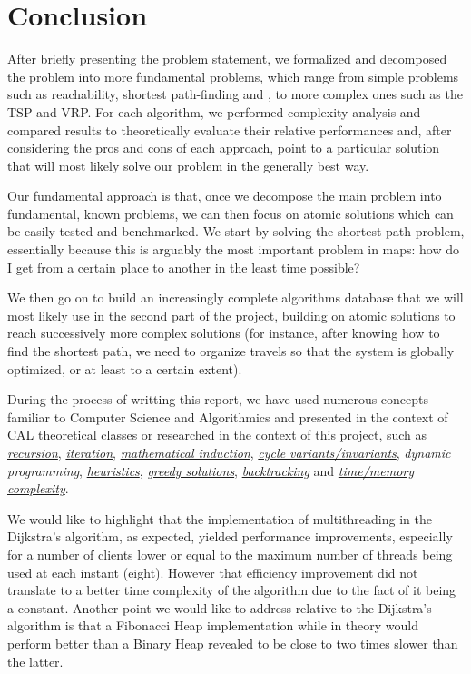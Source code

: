 \chapter{Conclusion} \label{conclusion}
After briefly presenting the problem statement, we formalized and decomposed the problem into more fundamental problems, which range from simple problems such as reachability, shortest path-finding and , to more complex ones such as the \acrshort{TSP} and \acrshort{VRP}. For each algorithm, we performed complexity analysis and compared results to theoretically evaluate their relative performances and, after considering the pros and cons of each approach, point to a particular solution that will most likely solve our problem in the generally best way.\par
Our fundamental approach is that, once we decompose the main problem into fundamental, known problems, we can then focus on atomic solutions which can be easily tested and benchmarked. We start by solving the shortest path problem, essentially because this is arguably the most important problem in maps: how do I get from a certain place to another in the least time possible?\par
We then go on to build an increasingly complete algorithms database that we will most likely use in the second part of the project, building on atomic solutions to reach successively more complex solutions (for instance, after knowing how to find the shortest path, we need to organize travels so that the system is globally optimized, or at least to a certain extent).\par
During the process of writting this report, we have used numerous concepts familiar to Computer Science and Algorithmics and presented in the context of CAL theoretical classes or researched in the context of this project, such as \emph{\hyperref[glsentry-recursive]{recursion}}, \emph{\hyperref[glsentry-iterative]{iteration}}, \emph{\hyperref[teor:dfs]{mathematical induction}}, \emph{\hyperref[sec:dijkstra-PoC]{cycle variants/invariants}}, \emph{\gls{dynamic programming}}, \emph{\hyperref[glsentry-heuristic]{heuristics}}, \emph{\hyperref[glsentry-greedy]{greedy solutions}}, \emph{\hyperref[algorithm-reachability-dfs]{backtracking}} and \emph{\hyperref[complexity-analysis]{time/memory complexity}}.\par

We would like to highlight that the implementation of multithreading in the Dijkstra's algorithm, as expected, yielded performance improvements, especially for a number of clients lower or equal to the maximum number of threads being used at each instant (eight). However that efficiency improvement did not translate to a better time complexity of the algorithm due to the fact of it being a constant.
Another point we would like to address relative to the Dijkstra's algorithm is that a Fibonacci Heap implementation while in theory would perform better than a Binary Heap revealed to be close to two times slower than the latter.

